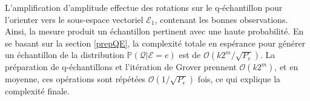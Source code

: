 \noindent
L'amplification d'amplitude effectue des rotations sur le q-échantillon pour l'orienter vers le sous-espace vectoriel $\mathcal{E}_1$, contenant les bonnes observations. Ainsi, la mesure produit un échantillon pertinent avec une haute probabilité. En se basant sur la section \ref{prepQE}, la complexité totale en espérance pour générer un échantillon de la distribution $\mathbb{P}(\mathcal{Q}|\mathcal{E}=e)$ est de $\mathcal{O}(k2^m/\sqrt{P_e})$. La préparation de q-échantillons et l'itération de Grover prennent $\mathcal{O}(k2^m)$, et en moyenne, ces opérations sont répétées $\mathcal{O}(1/\sqrt{P_e})$ fois, ce qui explique la complexité finale.